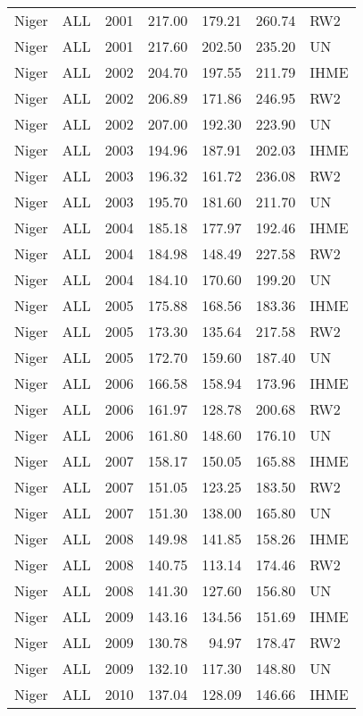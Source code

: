 \begin{longtable}{lllrrrl}
  Niger & ALL & 2001 & 217.00 & 179.21 & 260.74 & RW2 \\ 
  Niger & ALL & 2001 & 217.60 & 202.50 & 235.20 & UN \\ 
  Niger & ALL & 2002 & 204.70 & 197.55 & 211.79 & IHME \\ 
  Niger & ALL & 2002 & 206.89 & 171.86 & 246.95 & RW2 \\ 
  Niger & ALL & 2002 & 207.00 & 192.30 & 223.90 & UN \\ 
  Niger & ALL & 2003 & 194.96 & 187.91 & 202.03 & IHME \\ 
  Niger & ALL & 2003 & 196.32 & 161.72 & 236.08 & RW2 \\ 
  Niger & ALL & 2003 & 195.70 & 181.60 & 211.70 & UN \\ 
  Niger & ALL & 2004 & 185.18 & 177.97 & 192.46 & IHME \\ 
  Niger & ALL & 2004 & 184.98 & 148.49 & 227.58 & RW2 \\ 
  Niger & ALL & 2004 & 184.10 & 170.60 & 199.20 & UN \\ 
  Niger & ALL & 2005 & 175.88 & 168.56 & 183.36 & IHME \\ 
  Niger & ALL & 2005 & 173.30 & 135.64 & 217.58 & RW2 \\ 
  Niger & ALL & 2005 & 172.70 & 159.60 & 187.40 & UN \\ 
  Niger & ALL & 2006 & 166.58 & 158.94 & 173.96 & IHME \\ 
  Niger & ALL & 2006 & 161.97 & 128.78 & 200.68 & RW2 \\ 
  Niger & ALL & 2006 & 161.80 & 148.60 & 176.10 & UN \\ 
  Niger & ALL & 2007 & 158.17 & 150.05 & 165.88 & IHME \\ 
  Niger & ALL & 2007 & 151.05 & 123.25 & 183.50 & RW2 \\ 
  Niger & ALL & 2007 & 151.30 & 138.00 & 165.80 & UN \\ 
  Niger & ALL & 2008 & 149.98 & 141.85 & 158.26 & IHME \\ 
  Niger & ALL & 2008 & 140.75 & 113.14 & 174.46 & RW2 \\ 
  Niger & ALL & 2008 & 141.30 & 127.60 & 156.80 & UN \\ 
  Niger & ALL & 2009 & 143.16 & 134.56 & 151.69 & IHME \\ 
  Niger & ALL & 2009 & 130.78 & 94.97 & 178.47 & RW2 \\ 
  Niger & ALL & 2009 & 132.10 & 117.30 & 148.80 & UN \\ 
  Niger & ALL & 2010 & 137.04 & 128.09 & 146.66 & IHME \\ 

\end{longtable}
